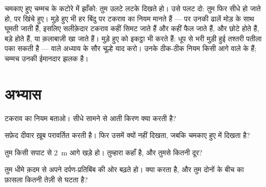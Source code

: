 \begin{remark}[तमाशे वाले चम्मच]\label{rem:g5:mirrors-reflection:curved}
चमकाए हुए चम्मच के कटोरे में झाँको: तुम उलटे लटके दिखते हो। उसे पलट
दो: तुम फिर सीधे हो जाते हो, पर खिंचे हुए। मुड़े हुए  भी हर
बिंदु पर टकराव का नियम मानते हैं --- पर उनकी ढालें मोड़ के साथ घूमती
जाती हैं, इसलिए सलीक़ेदार टकराव कहीं सिमट जाते हैं और कहीं फैल जाते
हैं, और  छोटे होते हैं, बड़े होते हैं, या क़लाबाज़ी खा जाते
हैं। मुड़े हुए   को इकट्ठा भी करते हैं: धूप से भरी मुड़ी
हुई तश्तरी पतीला पका सकती है ---  वाले अध्याय के सौर चूल्हे याद
करो। उनके ठीक-ठीक नियम किसी आगे वाले  के हैं; चम्मच उनकी ईमानदार
झलक है।
\end{remark}

\section{अभ्यास}

\begin{exercise}[$\star$]\label{exo:g5:mirrors-reflection:1}
टकराव का नियम बताओ। सीधे सामने से आती किरण क्या करती है?
\end{exercise}

\begin{exercise}[$\star$]\label{exo:g5:mirrors-reflection:2}
सफ़ेद दीवार ख़ूब  परावर्तित करती है। फिर उसमें  क्यों
नहीं दिखता, जबकि चमकाए हुए  में दिखता है?
\end{exercise}

\begin{exercise}[$\star$]\label{exo:g5:mirrors-reflection:3}
तुम किसी सपाट  से \qty{2}{m} आगे खड़े हो। तुम्हारा 
कहाँ है, और तुमसे कितनी दूर?
\end{exercise}

\begin{exercise}[$\star$]\label{exo:g5:mirrors-reflection:4}
तुम धीमे क़दम से अपने दर्पण-प्रतिबिंब की ओर बढ़ते हो।  क्या
करता है, और तुम दोनों के बीच का फ़ासला कितनी तेज़ी से घटता है?
\end{exercise}

